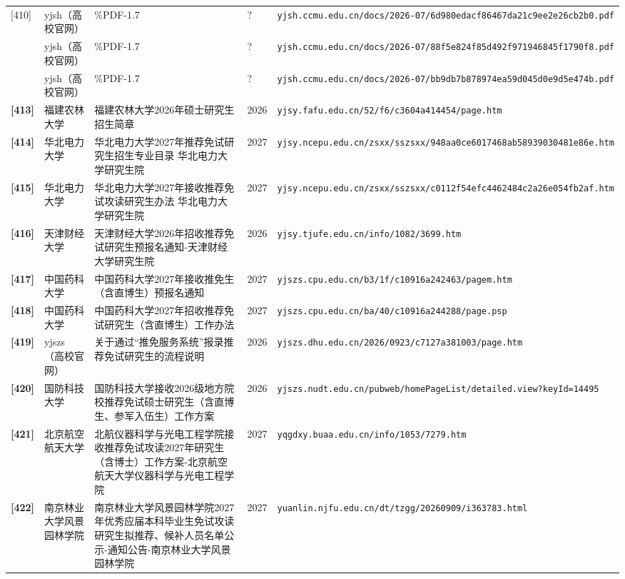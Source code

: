 {\begin{longtable}{@{}p{1.15cm}p{2.9cm}p{6.3cm}p{0.85cm}p{5.0cm}@{}}
[410] & yjsh（高校官网） & \%PDF-1.7 & ? & \texttt{yjsh.ccmu.edu.cn/docs/2026-07/6d980edacf86467da21c9ee2e26cb2b0.pdf} \\
[411] & yjsh（高校官网） & \%PDF-1.7 & ? & \texttt{yjsh.ccmu.edu.cn/docs/2026-07/88f5e824f85d492f971946845f1790f8.pdf} \\
[412] & yjsh（高校官网） & \%PDF-1.7 & ? & \texttt{yjsh.ccmu.edu.cn/docs/2026-07/bb9db7b878974ea59d045d0e9d5e474b.pdf} \\
\textbf{[413]} & 福建农林大学 & 福建农林大学2026年硕士研究生招生简章 & 2026 & \texttt{yjsy.fafu.edu.cn/52/f6/c3604a414454/page.htm} \\
\textbf{[414]} & 华北电力大学 & 华北电力大学2027年推荐免试研究生招生专业目录 华北电力大学研究生院 & 2027 & \texttt{yjsy.ncepu.edu.cn/zsxx/sszsxx/948aa0ce6017468ab58939030481e86e.htm} \\
\textbf{[415]} & 华北电力大学 & 华北电力大学2027年接收推荐免试攻读研究生办法 华北电力大学研究生院 & 2027 & \texttt{yjsy.ncepu.edu.cn/zsxx/sszsxx/c0112f54efc4462484c2a26e054fb2af.htm} \\
\textbf{[416]} & 天津财经大学 & 天津财经大学2026年招收推荐免试研究生预报名通知-天津财经大学研究生院 & 2026 & \texttt{yjsy.tjufe.edu.cn/info/1082/3699.htm} \\
\textbf{[417]} & 中国药科大学 & 中国药科大学2027年接收推免生（含直博生）预报名通知 & 2027 & \texttt{yjszs.cpu.edu.cn/b3/1f/c10916a242463/pagem.htm} \\
\textbf{[418]} & 中国药科大学 & 中国药科大学2027年招收推荐免试研究生（含直博生）工作办法 & 2027 & \texttt{yjszs.cpu.edu.cn/ba/40/c10916a244288/page.psp} \\
\textbf{[419]} & yjszs（高校官网） & 关于通过“推免服务系统”报录推荐免试研究生的流程说明 & 2026 & \texttt{yjszs.dhu.edu.cn/2026/0923/c7127a381003/page.htm} \\
\textbf{[420]} & 国防科技大学 & 国防科技大学接收2026级地方院校推荐免试硕士研究生（含直博生、参军入伍生）工作方案 & 2026 & \texttt{yjszs.nudt.edu.cn/pubweb/homePageList/detailed.view?keyId=14495} \\
\textbf{[421]} & 北京航空航天大学 & 北航仪器科学与光电工程学院接收推荐免试攻读2027年研究生（含博士）工作方案-北京航空航天大学仪器科学与光电工程学院 & 2027 & \texttt{yqgdxy.buaa.edu.cn/info/1053/7279.htm} \\
\textbf{[422]} & 南京林业大学风景园林学院 & 南京林业大学风景园林学院2027年优秀应届本科毕业生免试攻读研究生拟推荐、候补人员名单公示-通知公告-南京林业大学风景园林学院 & 2027 & \texttt{yuanlin.njfu.edu.cn/dt/tzgg/20260909/i363783.html} \\

\end{longtable}}
